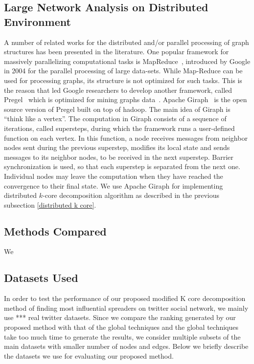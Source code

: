 \documentclass[sigconf]{acmart}
\begin{document}
\subsection{Large Network Analysis on Distributed Environment}
A number of related works for the distributed and/or parallel processing of graph structures has been presented in the literature. One popular framework for massively parallelizing
computational tasks is MapReduce~\cite{dean2008mapreduce}, introduced by Google in 2004 for the parallel processing of large data-sets. While Map-Reduce can be used for processing graphs, its structure is not optimized for such tasks. This is the reason that led Google researchers to develop another framework, called Pregel~\cite{malewicz2010pregel} which is optimized for mining graphs data~\cite{han2014experimental}. Apache Giraph~\cite{martella2012apache,martella2015practical} is the open source version of Pregel built on top of hadoop. The main idea of Giraph is ``think like a vertex''. The computation in Giraph consists of a sequence of iterations, called supersteps, during which the framework runs a user-defined function on each vertex. In this function, a node receives messages from neighbor nodes sent during the previous superstep, modifies its local state and sends messages to its neighbor nodes, to be received in the next superstep. Barrier synchronization is used, so that each superstep is separated from the next one. Individual nodes may leave the computation when they have reached the convergence to their final state.
We use Apache Giraph for implementing distributed $k$-core decomposition algorithm as described in the previous subsection \ref{distributed k core}.


\subsection{Methods Compared}
We 

\subsection{Datasets Used}
In order to test the performance of our proposed modified K core decomposition method of finding most influential spreaders on twitter social network, we mainly use *** real twitter datasets. Since we compare the ranking generated by our proposed method with that of the global techniques and the global techniques take too much time to generate the results, we consider multiple subsets of the main datasets with smaller number of nodes and edges. Below we briefly describe the datasets we use for evaluating our proposed method.
\end{document}
